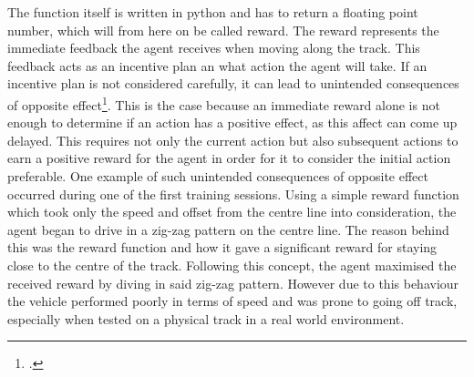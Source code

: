 The function itself is written in python and has to return a floating point number, which will from here on be called reward. The reward represents the immediate feedback the agent receives when moving along the track. This feedback acts as an incentive plan an what action the agent will take. If an incentive plan is not considered carefully, it can lead to unintended consequences of opposite effect\footcite{AWS19}. This is the case because an immediate reward alone is not enough to determine if an action has a positive effect, as this affect can come up delayed. This requires not only the current action but also subsequent actions to earn a positive reward for the agent in order for it to consider the initial action preferable. One example of such unintended consequences of opposite effect occurred during one of the first training sessions. Using a simple reward function which took only the speed and offset from the centre line into consideration, the agent began to drive in a zig-zag pattern on the centre line. The reason behind this was the reward function and how it gave a significant reward for staying close to the centre of the track. Following this concept, the agent maximised the received reward by diving in said zig-zag pattern. However due to this behaviour the vehicle performed poorly in terms of speed and was prone to going off track, especially when tested on a physical track in a real world environment.